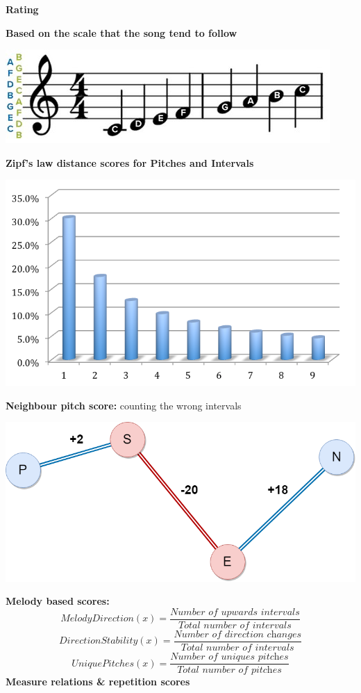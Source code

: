 \documentclass[a0,portrait]{a0poster}
\begin{document}
\begin{multicols}{2}
\begin{flushleft}
	\Large{\textbf{Rating}}
\end{flushleft}
\vspace{0.1cm}
\textbf{Based on the scale that the song tend to follow}
\begin{center}
\includegraphics[width=0.6\linewidth]{scale}
\end{center}
\textbf{Zipf's law distance scores for Pitches and Intervals}
\begin{center}
	\includegraphics[width=0.6\linewidth]{zipfs}
\end{center}
\textbf{Neighbour pitch score:} counting the wrong intervals
\begin{center}
	\includegraphics[width=0.6\linewidth]{Case1}
\end{center}
\textbf{Melody based scores:}
	\[ MelodyDirection(x) = \frac{\textit{Number of upwards intervals}}{\textit{Total number of intervals} } \]
	\[ DirectionStability(x) = \frac{\textit{Number of direction changes}}{\textit{Total number of intervals} } \]
	\[ UniquePitches(x) = \frac{\textit{Number of uniques pitches}}{\textit{Total number of pitches} } \]
\textbf{Measure relations \& repetition scores}


\end{multicols}
\end{document}
